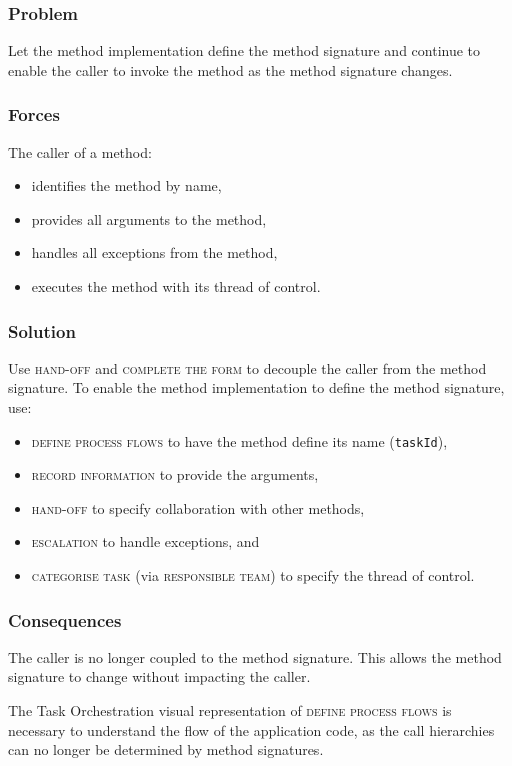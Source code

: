 \documentclass[prodmode]{style/acmlarge}
\begin{document}
\subsubsection*{\textbf{Problem}} Let the method implementation define the method
signature and continue to enable the caller to invoke the method as the method
signature changes.

\subsubsection*{Forces} The caller of a method:
\begin{itemize}
  \item identifies the method by name,
  \item provides all arguments to the method,
  \item handles all exceptions from the method,
  \item executes the method with its thread of control.
\end{itemize}

\subsubsection*{\textbf{Solution}} Use \textsc{hand-off} and \textsc{complete the form}
to decouple the caller from the method signature.  To enable the method
implementation to define the method signature, use:
\begin{itemize}
  \item \textsc{define process flows} to have the method define its name (\texttt{taskId}),
  \item \textsc{record information} to provide the arguments,
  \item \textsc{hand-off} to specify collaboration with other methods,
  \item \textsc{escalation} to handle exceptions, and
  \item \textsc{categorise task} (via \textsc{responsible team}) to specify the thread of control.    
\end{itemize}

\subsubsection*{Consequences} The caller is no longer coupled to the method
signature.  This allows the method signature to change without impacting the
caller.

The Task Orchestration visual representation of \textsc{define process flows} is
necessary to understand the flow of the application code, as the call
hierarchies can no longer be determined by method signatures.
\end{document}
